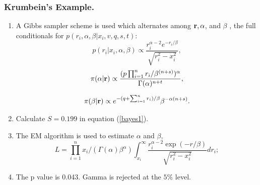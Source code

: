 \documentclass{beamer}
\newcounter{saveenumi}
\newcommand{\seti}{\setcounter{saveenumi}{\value{enumi}}}
\newcommand{\conti}{\setcounter{enumi}{\value{saveenumi}}}
\begin{document}
  
 
    \frame
{
  \frametitle{Krumbein's Example.}
 \begin{enumerate}
 \conti
\item
A Gibbs sampler scheme is used which alternates among $\bold{r}, \alpha$, 
  and $\beta$ , the full conditionals for 
  $p(r_i, \alpha, \beta| x_i, v, q, s, t):$
   \begin{equation*}
   \label{cond_r}
 p(r_i| x_i, \alpha, \beta)\propto 
  \frac{r_i^{\alpha-2}e^{-r_i/\beta}}{\sqrt{r_i^2-x_i^2}},
  \end{equation*}
   \begin{equation*}
    \label{cond_alpha}
 \pi(\alpha|\bold{r})\propto 
 \frac{(p\prod_{i=1}^nr_i/\beta^{(n+s)})^{\alpha}}{\Gamma(\alpha)^{n+t}},
  \end{equation*}

   \begin{equation*}
    \label{cond_beta}
 \pi(\beta|\bold{r})\propto 
 e^{-(q+\sum_{i=1}^nr_i)/\beta}
\beta^{-\alpha (n+s)}.
  \end{equation*}
 

\item
Calculate $S=0.199$  in equation (\ref{bayes1}).
\item
The EM algorithm is used to estimate $\alpha$ and $\beta,$ 
$$L=  \prod_{i=1}^n x_i/(\Gamma(\alpha)\beta^\alpha)
\int_{x_i}^\infty \frac{r_i^{\alpha-2}\exp(-r/\beta)}
{\sqrt{r_i^2-x_i^2}}dr_i; 
$$ 
\item
The p value is 0.043.
Gamma is rejected at the $5\%$ level.
\end{enumerate}
}

  




  
 
\end{document}
